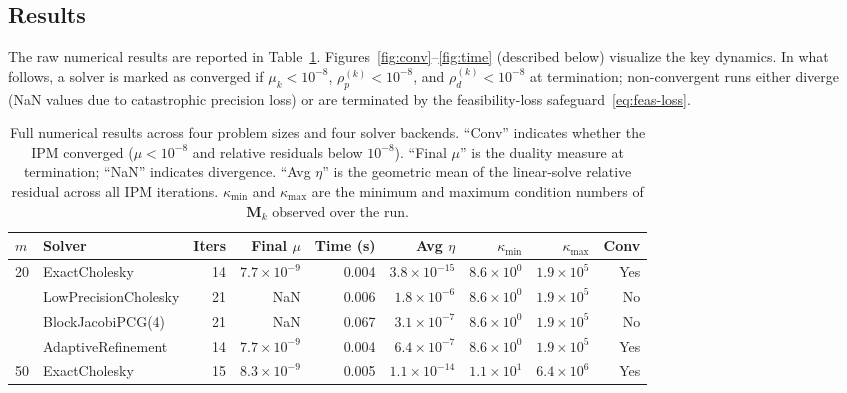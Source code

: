 \documentclass[11pt,twoside]{article}
\newcommand{\bM}{\mathbf{M}}
\begin{document}
\subsection{Results}

The raw numerical results are reported in
Table~\ref{tab:full-results}.  Figures~\ref{fig:conv}--\ref{fig:time}
(described below) visualize the key dynamics.  In what follows, a solver
is marked as converged if $\mu_k < 10^{-8}$, $\rho_p^{(k)} < 10^{-8}$,
and $\rho_d^{(k)} < 10^{-8}$ at termination; non-convergent runs either
diverge (NaN values due to catastrophic precision loss) or are terminated
by the feasibility-loss safeguard~\eqref{eq:feas-loss}.

\begin{table}[p]
  \centering
  \caption{Full numerical results across four problem sizes and four
           solver backends.  ``Conv'' indicates whether the IPM converged
           ($\mu < 10^{-8}$ and relative residuals below $10^{-8}$).
           ``Final $\mu$'' is the duality measure at termination; ``NaN''
           indicates divergence.  ``Avg $\eta$'' is the geometric mean of
           the linear-solve relative residual across all IPM iterations.
           $\kappa_{\min}$ and $\kappa_{\max}$ are the minimum and maximum
           condition numbers of $\bM_k$ observed over the run.}
  \label{tab:full-results}
  \small
  \begin{tabular}{@{}llrrrrrrr@{}}
    \toprule
    $m$ & Solver & Iters & Final $\mu$ & Time (s) & Avg $\eta$
        & $\kappa_{\min}$ & $\kappa_{\max}$ & Conv \\
    \midrule
    \multirow{4}{*}{20}
      & ExactCholesky        & 14 & $7.7\times 10^{-9}$  & 0.004 & $3.8\times 10^{-15}$ & $8.6\times 10^0$  & $1.9\times 10^5$   & Yes \\
      & LowPrecisionCholesky & 21 & NaN                  & 0.006 & $1.8\times 10^{-6}$  & $8.6\times 10^0$  & $1.9\times 10^5$   & No  \\
      & BlockJacobiPCG(4)    & 21 & NaN                  & 0.067 & $3.1\times 10^{-7}$  & $8.6\times 10^0$  & $1.9\times 10^5$   & No  \\
      & AdaptiveRefinement   & 14 & $7.7\times 10^{-9}$  & 0.004 & $6.4\times 10^{-7}$  & $8.6\times 10^0$  & $1.9\times 10^5$   & Yes \\
    \cmidrule{1-9}
    \multirow{4}{*}{50}
      & ExactCholesky        & 15 & $8.3\times 10^{-9}$  & 0.005 & $1.1\times 10^{-14}$ & $1.1\times 10^1$  & $6.4\times 10^6$   & Yes \\

\end{tabular}
\end{table}
\end{document}
